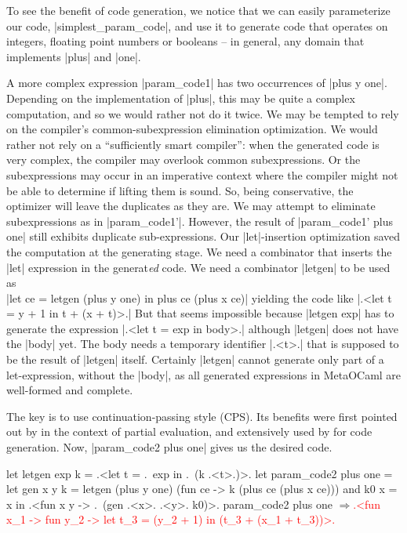 \documentclass{llncs}
\newcommand{\evalresult}[1]{\ensuremath{\Longrightarrow}\textcolor{red}{#1}}
\begin{document}
To see the benefit of code generation, we notice that we can easily
parameterize our code, |simplest_param_code|, and use it to generate
code that operates on integers, floating point numbers or booleans --
in general, any domain that implements |plus| and |one|.

A more complex expression |param_code1| has two occurrences of 
|plus y one|. Depending on the implementation of |plus|, this may be quite a
complex computation, and so we would rather not do it twice. We may be
tempted to rely on the compiler's common-subexpression elimination
optimization. We would rather not rely on a ``sufficiently smart
compiler'': when the generated code is very complex, the compiler may
overlook common subexpressions.  Or the subexpressions may occur in an
imperative context where the compiler might not be able to determine
if lifting them is sound. So, being conservative, the optimizer will
leave the duplicates as they are. We may attempt to eliminate
subexpressions as in |param_code1'|. However, the result of
|param_code1' plus one| still exhibits duplicate sub-expressions. 
Our |let|-insertion
optimization saved the computation at the generating stage. 
We need a combinator that inserts the |let| expression in the
generat\emph{ed} code. We need a combinator |letgen| to be used
as\\|let ce = letgen (plus y one) in plus ce (plus x ce)| 
yielding the code like |.<let t = y + 1 in t + (x + t)>.|
But that seems impossible because |letgen exp| has to generate
the expression |.<let t = exp in body>.| although |letgen| does not have
the |body| yet. The body needs a temporary identifier |.<t>.| that
is supposed to be the result of |letgen| itself. 
Certainly |letgen| cannot generate only part of a let-expression,
without the |body|,  as all generated expressions in
MetaOCaml are well-formed and complete.

The key is to use continuation-passing style (CPS). Its benefits were first
pointed out by \cite{Bondorf:92} in the context
of partial evaluation, and extensively used by \cite{KiselyovTaha} for code
generation. Now, |param_code2 plus one| gives us the desired code. 

\begin{code}
let letgen exp k = .<let t = .~exp in .~(k .<t>.)>.
let param_code2 plus one =
  let gen x y k = letgen (plus y one) (fun ce -> k (plus ce (plus x ce)))
  and k0 x = x
  in .<fun x y -> .~(gen .<x>. .<y>. k0)>.
param_code2 plus one
\evalresult{.<fun x_1 -> fun y_2 -> let t_3 = (y_2 + 1) in (t_3 + (x_1 + t_3))>.}
\end{code}
\end{document}
